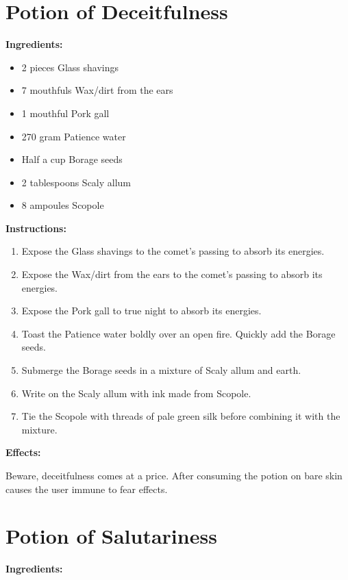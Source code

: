 \documentclass{article}
\begin{document}
\newpage
\section*{Potion of Deceitfulness}

\textbf{Ingredients:}

\begin{itemize}
  \item 2 pieces Glass shavings
  \item 7 mouthfuls Wax/dirt from the ears
  \item 1 mouthful Pork gall
  \item 270 gram Patience water
  \item Half a cup Borage seeds
  \item 2 tablespoons Scaly allum
  \item 8 ampoules Scopole
\end{itemize}

\textbf{Instructions:}

\begin{enumerate}
  \item Expose the Glass shavings to the comet’s passing to absorb its energies.
  \item Expose the Wax/dirt from the ears to the comet’s passing to absorb its energies.
  \item Expose the Pork gall to true night to absorb its energies.
  \item Toast the Patience water boldly over an open fire. Quickly add the Borage seeds.
  \item Submerge the Borage seeds in a mixture of Scaly allum and earth.
  \item Write on the Scaly allum with ink made from Scopole.
  \item Tie the Scopole with threads of pale green silk before combining it with the mixture.
\end{enumerate}

\textbf{Effects:}

Beware, deceitfulness comes at a price. After consuming the potion on bare skin causes the user immune to fear effects.

\newpage
\section*{Potion of Salutariness}

\textbf{Ingredients:}
\end{document}
